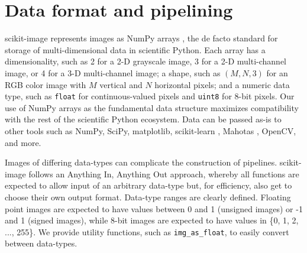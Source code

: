 
\section*{Data format and pipelining}
  \label{sec:data-format-and-pipelining}

  scikit-image represents images as NumPy arrays \citep{numpy}, the de facto standard for storage of multi-dimensional data in scientific Python. Each array has a dimensionality, such as 2 for a 2-D grayscale image, 3 for a 2-D multi-channel image, or 4 for a 3-D multi-channel image; a shape, such as $(M, N, 3)$ for an RGB color image with $M$ vertical and $N$ horizontal pixels; and a numeric data type, such as \texttt{float} for continuous-valued pixels and \texttt{uint8} for 8-bit pixels. Our use of NumPy arrays as the fundamental data structure maximizes compatibility with the rest of the scientific Python ecosystem. Data can be passed as-is to other tools such as NumPy, SciPy, matplotlib, scikit-learn \citep{scikit-learn}, Mahotas \citep{Mahotas}, OpenCV, and more.

  Images of differing data-types can complicate the construction of pipelines. scikit-image follows an \textquotedbl{}Anything In, Anything Out\textquotedbl{} approach, whereby all functions are expected to allow input of an arbitrary data-type but, for efficiency, also get to choose their own output format. Data-type ranges are clearly defined. Floating point images are expected to have values between 0 and 1 (unsigned images) or -1 and 1 (signed images), while 8-bit images are expected to have values in \{0, 1, 2, ..., 255\}. We provide utility functions, such as \texttt{img\_as\_float}, to easily convert between data-types.
